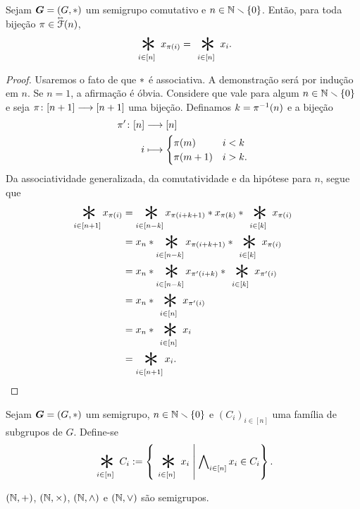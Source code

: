 \begin{proposition}
Sejam $\bm G=(G,\ast)$ um semigrupo comutativo e $n \in \mathbb{N} \smallsetminus \{0\}$. Então, para toda bijeção $\pi \in \accentset{\leftrightarrow}{\mathcal{F}}(n)$,%
	\begin{equation*}
	\bigopb_{i \in [n]} x_{\pi(i)} = \bigopb_{i \in [n]} x_i.
	\end{equation*}
\end{proposition}
\begin{proof}
Usaremos o fato de que $\ast$ é associativa. A demonstração será por indução em $n$. Se $n=1$, a afirmação é óbvia. Considere que vale para algum $n \in \mathbb{N} \smallsetminus \{0\}$ e seja ${\pi}\colon {[n+1]} \longrightarrow {[n+1]}$ uma bijeção. Definamos $k = \pi^{-1}(n)$ e a bijeção
	\begin{align*}
	\func{\pi'}{[n]}{[n]}{i}{
		\begin{cases}
		\pi(m)		& i<k \\
		\pi(m+1) 	& i>k.
		\end{cases}
	}
	\end{align*}
Da associatividade generalizada, da comutatividade e da hipótese para $n$, segue que
	\begin{align*}
	\bigopb_{i \in [n+1]} x_{\pi(i)}
		&= \bigopb_{i \in [n-k]} x_{\pi(i+k+1)} \opb x_{\pi(k)} \opb \bigopb_{i \in [k]} x_{\pi(i)} \\
		&= x_{n} \opb \bigopb_{i \in [n-k]} x_{\pi(i+k+1)} \opb \bigopb_{i \in [k]} x_{\pi(i)} \\
		&= x_{n} \opb \bigopb_{i \in [n-k]} x_{\pi'(i+k)} \opb \bigopb_{i \in [k]} x_{\pi'(i)} \\
		&= x_n \opb \bigopb_{i \in [n]} x_{\pi'(i)}\\
		&= x_n \opb \bigopb_{i \in [n]} x_i \\
		&= \bigopb_{i \in [n+1]} x_i.
		\qedhere
	\end{align*}
\end{proof}


\begin{definition}
Sejam $\bm G=(G,\ast)$ um semigrupo, $n \in \mathbb{N} \smallsetminus \{0\}$ e $(C_i)_{i \in [n]}$ uma família de subgrupos de $G$. Define-se
	\begin{equation*}
	\bigopb _{i \in [n]} C_i := \set{\bigopb _{i \in [n]} x_i}{\forall_{i \in [n]} x_i \in C_i}.
	\end{equation*}
\end{definition}

\begin{example}
$(\mathbb{N},+)$, $(\mathbb{N},\times)$, $(\mathbb{N},\mathbin{\wedge})$ e $(\mathbb{N},\mathbin{\vee})$ são semigrupos.
\end{example}


